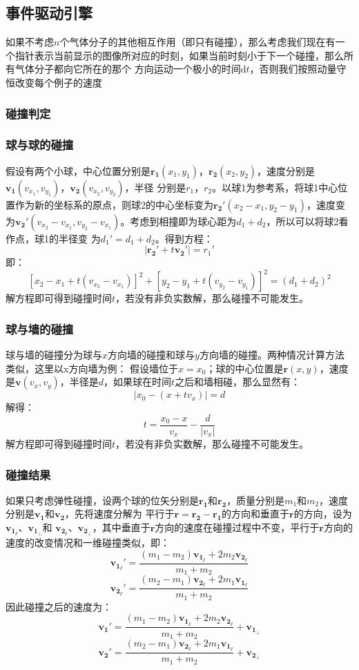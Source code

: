 ﻿\documentclass{article}
\begin{document}
	\subsection{事件驱动引擎}
	如果不考虑$n$个气体分子的其他相互作用（即只有碰撞），那么考虑我们现在有一个指针表示当前显示的图像所对应的时刻，如果当前时刻小于下一个碰撞，那么所有气体分子都向它所在的那个
	方向运动一个极小的时间$\mathrm{d}t$，否则我们按照动量守恒改变每个例子的速度
	\subsubsection{碰撞判定}
	\subsubsection*{球与球的碰撞}
	假设有两个小球，中心位置分别是$\mathbf{r_1}(x_1,y_1)$，$\mathbf{r_2}(x_2,y_2)$，速度分别是$\mathbf{v_1}(v_{x_1},v_{y_1})$，$\mathbf{v_2}(v_{x_2},v_{y_2})$，半径
	分别是$r_1$，$r_2$。以球1为参考系，将球1中心位置作为新的坐标系的原点，则球2的中心坐标变为$\mathbf{r_2'}(x_2-x_1,y_2-y_1)$，速度变
	为$\mathbf{v_2'}(v_{x_2}-v_{x_1},v_{y_2}-v_{x_1})$。考虑到相撞即为球心距为$d_1+d_2$，所以可以将球2看作点，球1的半径变
	为$d_1'=d_1+d_2$。得到方程：
	\[|\mathbf{r_2'}+t\mathbf{v_2'}|=r_1'\]
	即：
	\[[x_2-x_1+t(v_{x_2}-v_{x_1})]^2+[y_2-y_1+t(v_{y_2}-v_{y_1})]^2=(d_1+d_2)^2\]
	解方程即可得到碰撞时间$t$，若没有非负实数解，那么碰撞不可能发生。
	\subsubsection*{球与墙的碰撞}
	球与墙的碰撞分为球与$x$方向墙的碰撞和球与$y$方向墙的碰撞。两种情况计算方法类似，这里以x方向墙为例：
	假设墙位于$x=x_0$；球的中心位置是$\mathbf{r}(x,y)$，速度是$\mathbf{v}(v_x,v_y)$，半径是$d$，如果球在时间$t$之后和墙相碰，那么显然有：
	\[|x_0-(x+tv_x)|=d\]
	解得：
	\[t=\frac{x_0-x}{v_x}-\frac{d}{|v_x|}\]
	解方程即可得到碰撞时间$t$，若没有非负实数解，那么碰撞不可能发生。
	\subsubsection{碰撞结果}
	如果只考虑弹性碰撞\cite{ref3}，设两个球的位矢分别是$\mathbf{r_1}$和$\mathbf{r_2}$，质量分别是$m_1$和$m_2$，速度分别是$\mathbf{v_1}$和$\mathbf{v_2}$，先将速度分解为
	平行于$\mathbf{r} = \mathbf{r_2} - \mathbf{r_1}$的方向和垂直于$\mathbf{r}$的方向，设为$\mathbf{v_{1_\sslash}}$、$\mathbf{v_{1_\perp}}$和
	$\mathbf{v_{2_\sslash}}$、$\mathbf{v_{2_\perp}}$，其中垂直于$\mathbf{r}$方向的速度在碰撞过程中不变，平行于$\mathbf{r}$方向的速度的改变情况和一维碰撞类似，即：
	\[\mathbf{v_{1_\sslash}'} = \frac{(m_1 - m_2)\mathbf{v_{1_\sslash}}+2m_2\mathbf{v_{2_\sslash}}}{m_1 + m_2}\]
	\[\mathbf{v_{2_\sslash}'} = \frac{(m_2 - m_1)\mathbf{v_{2_\sslash}}+2m_1\mathbf{v_{1_\sslash}}}{m_1 + m_2}\]
	因此碰撞之后的速度为：
	\[\mathbf{v_1'} = \frac{(m_1 - m_2)\mathbf{v_{1_\sslash}}+2m_2\mathbf{v_{2_\sslash}}}{m_1 + m_2} + \mathbf{v_{1_\perp}}\]
	\[\mathbf{v_2'} = \frac{(m_2 - m_1)\mathbf{v_{2_\sslash}}+2m_1\mathbf{v_{1_\sslash}}}{m_1 + m_2} + \mathbf{v_{2_\perp}}\]
\end{document}

